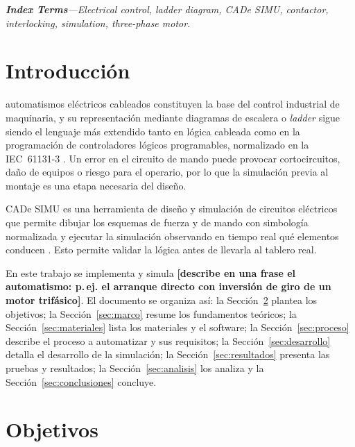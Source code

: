 \documentclass[conference,a4paper,10pt]{IEEEtran}
\begin{document}
\vspace{4pt}
\noindent\textit{\textbf{Index Terms}---Electrical control, ladder diagram,
CADe SIMU, contactor, interlocking, simulation, three-phase motor.}
\vspace{6pt}

\section{Introducción}
 automatismos eléctricos cableados constituyen la base del
control industrial de maquinaria, y su representación mediante diagramas de
escalera o \textit{ladder} sigue siendo el lenguaje más extendido tanto en
lógica cableada como en la programación de controladores lógicos programables,
normalizado en la IEC~61131-3 \cite{iec61131}. Un error en el circuito de mando
puede provocar cortocircuitos, daño de equipos o riesgo para el operario, por
lo que la simulación previa al montaje es una etapa necesaria del diseño.

CADe SIMU es una herramienta de diseño y simulación de circuitos eléctricos
que permite dibujar los esquemas de fuerza y de mando con simbología
normalizada y ejecutar la simulación observando en tiempo real qué elementos
conducen \cite{cadesimu}. Esto permite validar la lógica antes de llevarla al
tablero real.

En este trabajo se implementa y simula \textbf{[describe en una frase el
automatismo: p.\,ej. el arranque directo con inversión de giro de un motor
trifásico]}. El documento se organiza así: la Sección~\ref{sec:objetivos}
plantea los objetivos; la Sección~\ref{sec:marco} resume los fundamentos
teóricos; la Sección~\ref{sec:materiales} lista los materiales y el software;
la Sección~\ref{sec:proceso} describe el proceso a automatizar y sus
requisitos; la Sección~\ref{sec:desarrollo} detalla el desarrollo de la
simulación; la Sección~\ref{sec:resultados} presenta las pruebas y resultados;
la Sección~\ref{sec:analisis} los analiza y la Sección~\ref{sec:conclusiones}
concluye.

\section{Objetivos}\label{sec:objetivos}
\end{document}
